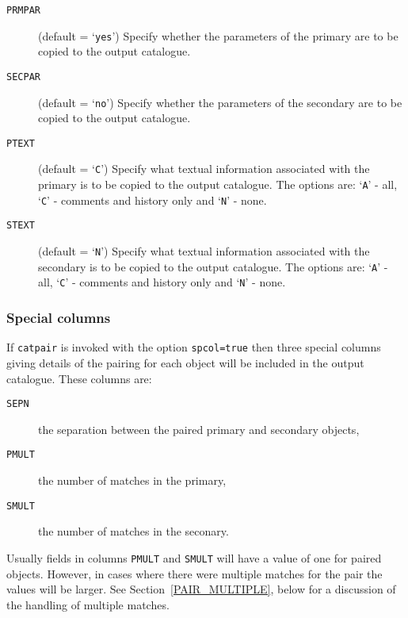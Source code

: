\documentclass[twoside,11pt]{starlink}
\begin{document}
\begin{description}
  \item[ \texttt{PRMPAR} ] (default = `\texttt{yes}') Specify whether the
   parameters of the primary are to be copied to the output catalogue.

  \item[ \texttt{SECPAR} ] (default = `\texttt{no}') Specify whether the
   parameters of the secondary are to be copied to the output catalogue.

  \item[ \texttt{PTEXT} ] (default = `\texttt{C}') Specify what textual
   information associated with the primary is to be copied to the output
   catalogue.  The options are: `\texttt{A}' - all,  `\texttt{C}' - comments
   and history only and `\texttt{N}' - none.

  \item[ \texttt{STEXT} ] (default = `\texttt{N}') Specify what textual
   information associated with the secondary is to be copied to the output
   catalogue.  The options are: `\texttt{A}' - all,  `\texttt{C}' - comments
   and history only and `\texttt{N}' - none.

\end{description}

\subsubsection{\label{PAIR_SPCOL}Special columns}

If \texttt{catpair} is invoked with the option \texttt{spcol=true} then three
special columns giving details of the pairing for each object will be
included in the output catalogue.  These columns are:

\begin{description}

  \item[\texttt{SEPN}] the separation between the paired primary and secondary
   objects,

  \item[\texttt{PMULT}] the number of matches in the primary,

  \item[\texttt{SMULT}] the number of matches in the seconary.

\end{description}

Usually fields in columns \texttt{PMULT} and \texttt{SMULT} will have a value
of one for paired objects.  However, in cases where there were multiple
matches for the pair the values will be larger.  See
Section~\ref{PAIR_MULTIPLE}, below for a discussion of the handling of
multiple matches.
\end{document}
